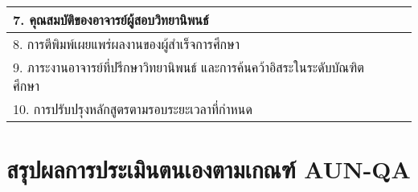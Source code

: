 {\begin{longtable}{|p{}|p{}|p{}|}
		7. คุณสมบัติของอาจารย์ผู้สอบวิทยานิพนธ์	&&	\\\hline	
		8. การตีพิมพ์เผยแพร่ผลงานของผู้สำเร็จการศึกษา	&&	\\\hline	
		9. ภาระงานอาจารย์ที่ปรึกษาวิทยานิพนธ์\newline\hspace*{0.3cm} และการค้นคว้าอิสระในระดับบัณฑิตศึกษา	&&	\\\hline	
		10. การปรับปรุงหลักสูตรตามรอบระยะเวลาที่กำหนด	&&	\\\hline	
		\end{longtable}}


\section{สรุปผลการประเมินตนเองตามเกณฑ์ AUN-QA}

